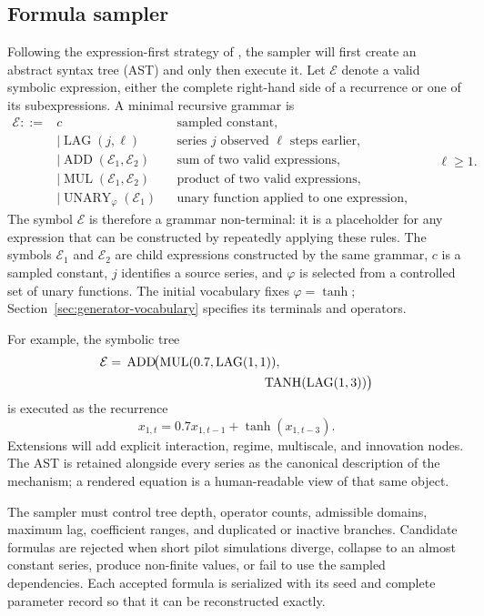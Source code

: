 \subsection{Formula sampler}

Following the expression-first strategy of \citet{dascoli2022deep}, the
sampler will first create an abstract syntax tree (AST) and only then execute
it. Let $\mathcal E$ denote a valid symbolic expression, either the complete
right-hand side of a recurrence or one of its subexpressions. A minimal
recursive grammar is
\[
\begin{aligned}
\mathcal E ::= {}& c
&& \text{sampled constant,}\\
&\mid \operatorname{LAG}(j,\ell)
&& \text{series $j$ observed $\ell$ steps earlier,}\\
&\mid \operatorname{ADD}(\mathcal E_1,\mathcal E_2)
&& \text{sum of two valid expressions,}\\
&\mid \operatorname{MUL}(\mathcal E_1,\mathcal E_2)
&& \text{product of two valid expressions,}\\
&\mid \operatorname{UNARY}_{\varphi}(\mathcal E_1)
&& \text{unary function applied to one expression,}
\end{aligned}
\qquad \ell\geq 1.
\]
The symbol $\mathcal E$ is therefore a grammar non-terminal: it is a
placeholder for any expression that can be constructed by repeatedly applying
these rules. The symbols $\mathcal E_1$ and $\mathcal E_2$ are child
expressions constructed by the same grammar, $c$ is a sampled constant, $j$
identifies a source series, and $\varphi$ is selected from a controlled set of
unary functions. The initial vocabulary fixes $\varphi=\tanh$;
Section~\ref{sec:generator-vocabulary} specifies its terminals and operators.

For example, the symbolic tree
\[
\begin{aligned}
\mathcal E={}&\operatorname{ADD}\!\bigl(
    \operatorname{MUL}(0.7,\operatorname{LAG}(1,1)),\\
&\hspace{38mm}\operatorname{TANH}(\operatorname{LAG}(1,3))
\bigr)
\end{aligned}
\]
is executed as the recurrence
\[
x_{1,t}=0.7x_{1,t-1}+\tanh(x_{1,t-3}).
\]
Extensions will add explicit interaction, regime, multiscale, and innovation
nodes. The AST is retained alongside every series as the canonical description
of the mechanism; a rendered equation is a human-readable view of that same
object.

The sampler must control tree depth, operator counts, admissible domains,
maximum lag, coefficient ranges, and duplicated or inactive branches. Candidate
formulas are rejected when short pilot simulations diverge, collapse to an
almost constant series, produce non-finite values, or fail to use the sampled
dependencies. Each accepted formula is serialized with its seed and complete
parameter record so that it can be reconstructed exactly.

